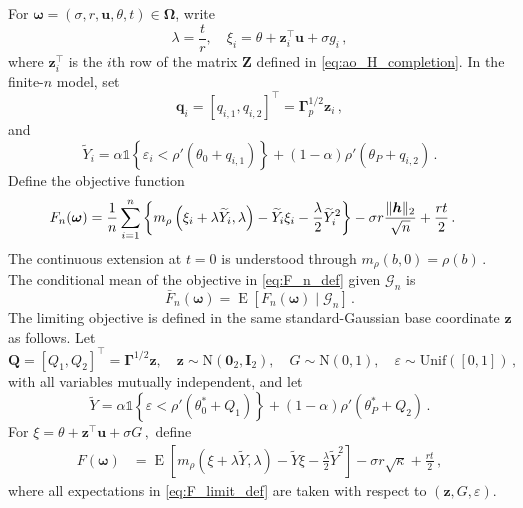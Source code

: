 \documentclass{article}
\makeatletter
\DeclareMathOperator{\expect}{E}
\theoremstyle{definition}
\newcommand{\vnorm}[1]{%
	\ensuremath{%
		\if@display
		\left\| #1 \right\|
		\else
		\| #1 \|
		\fi
	}%
}
\newcommand*{\bb}{\boldsymbol}
\def\bu{\bb{u}}
\def\bh{\bb{h}}
\def\Ytil{\widetilde{Y}}
\def\bz{\bb{z}}
\newcommand{\rank}{\operatorname{rank}}
\makeatother
\begin{document}
\begin{bibunit}
For $\bb\omega=(\sigma,r,\bu,\theta,t)\in\bb\Omega$, write
$$
	\lambda=\frac{t}{r},
	\quad
	\xi_i=\theta+\bz_i^\top\bu+\sigma g_i\,,
$$
where $\bz_i^\top$ is the $i$th row of the matrix $\bb Z$ defined in
\eqref{eq:ao_H_completion}.
In the finite-$n$ model, set
$$
	\bb q_i=[q_{i,1}, q_{i,2}]^\top = \bb\Gamma_p^{1/2}\bz_i\,,
$$
and
$$
	\Ytil_i
	=
	\alpha\mathds{1}
	\left\{
		\varepsilon_i<\rho'(\theta_0+q_{i,1})
	\right\}
	+
	(1-\alpha)\rho'(\theta_P+q_{i,2})\,.
$$
Define the objective function
\begin{equation}
	\label{eq:F_n_def}
	\begin{aligned}
		F_n(\bb\omega)
		&=
		\frac1n
		\sum_{i=1}^n
		\left\{
			m_\rho\left(\xi_i+\lambda \Ytil_i,\lambda\right)
			-
			\Ytil_i\xi_i
			-
			\frac{\lambda}{2}\Ytil_i^2
		\right\}
		-
		\sigma r\frac{\vnorm{\bh}_2}{\sqrt n}
		+
		\frac{rt}{2}\,.
	\end{aligned}
\end{equation}
The continuous extension at $t=0$ is understood through $m_\rho(b,0)=\rho(b)\,.$
The conditional mean of the objective in \eqref{eq:F_n_def} given $\mathcal{G}_n$ is
\begin{equation}
	\label{eq:F_bar_n_def}
	\bar F_n(\bb\omega)
	=
	\expect\left[
		F_n(\bb\omega)
		\mid
		\mathcal G_n
	\right]\,.
\end{equation}
The limiting objective is defined in the same standard-Gaussian base
coordinate $\bz$ as follows. Let
$$
	\bb Q=[Q_1,Q_2]^\top = \bb\Gamma^{1/2}\bz,
	\quad
	\bz\sim\mathrm N(\bb0_2,\bb I_2),
	\quad
	G\sim\mathrm N(0,1),
	\quad
	\varepsilon\sim\mathrm{Unif}([0,1]) \,,
$$
with all variables mutually independent, and let
$$
	\Ytil
	=
	\alpha\mathds{1}
	\left\{
		\varepsilon<\rho'(\theta_0^*+Q_1)
	\right\}
	+
	(1-\alpha)\rho'(\theta_P^*+Q_2)\,.
$$
For $\xi=\theta+\bz^\top\bu+\sigma G\,,$
define
\begin{equation}
	\label{eq:F_limit_def}
	\begin{aligned}
		F(\bb\omega)
		&=
		\expect\left[
			m_\rho\left(\xi+\lambda \Ytil,\lambda\right)
			-
			\Ytil\xi
			-
			\frac{\lambda}{2}\Ytil^2
		\right]
		-
		\sigma r\sqrt\kappa
		+
		\frac{rt}{2}\,,
	\end{aligned}
\end{equation}
where all expectations in \eqref{eq:F_limit_def} are taken with respect to $(\bz,G,\varepsilon)$.


\end{bibunit}
\end{document}
